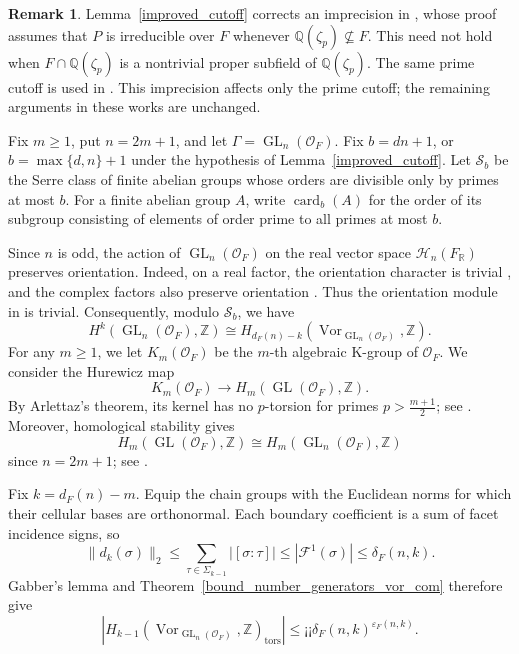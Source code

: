 \documentclass[11pt,a4paper,twoside]{amsart}
\theoremstyle{plain}
\theoremstyle{definition}
\newtheorem{remark}[theorem]{\bfseries Remark}
\newcommand{\rint}[0]{\mathcal{O}_F}
\newcommand{\GLo}[0]{\operatorname{GL}_n({\mathcal{O}_F})}
\newcommand{\Her}[0]{\mathcal{H}_n(\fr)}
\newcommand{\fr}[0]{F_\mathbb{R}}
\renewcommand{\leq}{\leqslant}
\renewcommand{\geq}{\geqslant}
\begin{document}
\begin{remark}
Lemma~\ref{improved_cutoff} corrects an imprecision in
\cite[Lemma~9]{soule_hermitian_bounds}, whose proof assumes
that $P$ is irreducible over $F$ whenever
$\mathbb Q(\zeta_p)\not\subseteq F$. This need not hold
when $F\cap\mathbb Q(\zeta_p)$ is a nontrivial proper
subfield of $\mathbb Q(\zeta_p)$.
The same prime cutoff is used in \cite{emery,Juliet_PHD}.
This imprecision affects only the prime cutoff; the remaining
arguments in these works are unchanged.
\end{remark}

Fix $m\geq1$, put $n=2m+1$, and let
$\Gamma=\GLo$. Fix $b=dn+1$, or $b=\max\{d,n\}+1$ under the hypothesis of Lemma~\ref{improved_cutoff}.
Let $\mathcal{S}_b$ be the Serre class of finite abelian
groups whose orders are divisible only by primes at most
$b$. For a finite abelian group $A$, write
$\operatorname{card}_b(A)$ for the order of its subgroup
consisting of elements of order prime to all primes at
most $b$.

Since $n$ is odd, the action of $\GLo$ on the real vector space $\Her$ preserves
orientation. Indeed, on a real factor, the orientation
character is trivial \cite[Lemma~7.2]{philippe_advances},
and the complex factors also preserve orientation \cite[Remark~2.5]{hermitian}.
Thus the orientation module in
\cite[Theorem~2.2]{Vor_comp_num_fields} is trivial.
Consequently, modulo $\mathcal{S}_b$, we have
\begin{equation}
    \label{comparasion}
    H^k(\GLo, \mathbb{Z}) \cong H_{d_F(n)-k}(\operatorname{Vor}_{\GLo},\mathbb{Z}).
\end{equation}
For any $m\geq1$, we let $K_m(\rint)$ be the $m$-th algebraic K-group of $\rint$. We consider the Hurewicz map
$$K_m(\rint)\to H_m(\operatorname{GL}(\rint),\mathbb Z).$$
By Arlettaz’s theorem, its kernel has no $p$-torsion for primes
$p>\frac{m+1}{2}$; see \cite[Theorem~1.5]{Hurewicz}.
Moreover, homological stability gives
$$H_m(\operatorname{GL}(\rint),\mathbb Z)\cong H_m(\GLo,\mathbb Z)$$
since $n=2m+1$; see \cite[Theorem~4.11]{stability}.

Fix $k=d_F(n)-m$. Equip the chain groups with the Euclidean norms for which their cellular bases are orthonormal. Each boundary coefficient is a sum of facet incidence signs, so
$$\|d_k(\sigma)\|_2\leq\sum_{\tau\in\Sigma_{k-1}}|[\sigma:\tau]|\leq|\mathcal F^1(\sigma)|\leq\delta_F(n,k).$$
Gabber's lemma \cite{soule_bounds} and Theorem~\ref{bound_number_generators_vor_com} therefore give
\begin{equation}\label{eq_vor_homology_bound}
|H_{k-1}(\operatorname{Vor}_{\GLo},\mathbb{Z})_{\mathrm{tors}}|\leq¡¡ \delta_F(n,k)^{\varepsilon_F(n,k)}.
\end{equation}
\end{document}
